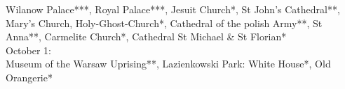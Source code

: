 Wilanow Palace***, Royal Palace***, Jesuit Church*, St John's Cathedral**, Mary's Church, Holy-Ghost-Church*, Cathedral of the polish Army**, St Anna**, Carmelite Church*, Cathedral St Michael \& St Florian*\\

October 1:\\
Museum of the Warsaw Uprising**, Lazienkowski Park: White House*, Old Orangerie*
